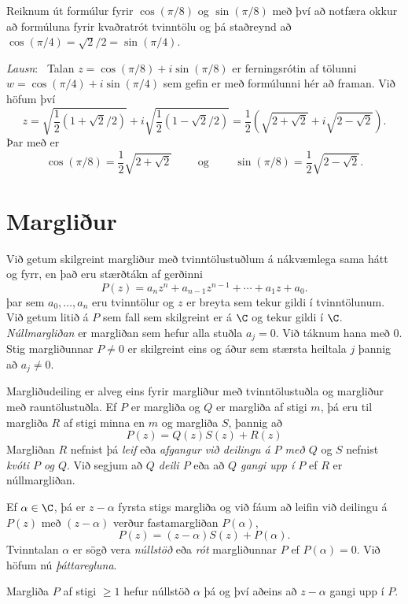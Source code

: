 \begin{sy} \label{sy:raetur} Reiknum út formúlur fyrir $\cos(\pi/8)$
og $\sin(\pi/8)$ með því að notfæra okkur að
formúluna fyrir kvaðratrót tvinntölu og þá staðreynd
að $\cos(\pi/4)=\sqrt 2/2=\sin(\pi/4)$.  

\smallskip\noindent
{\it Lausn}: \ Talan $z=\cos(\pi/8)+i\sin(\pi/8)$ er
ferningsrótin af tölunni $w=\cos(\pi/4)+i\sin(\pi/4)$
sem gefin er með formúlunni hér að framan.  Við höfum því
$$
z=\sqrt{\dfrac 12(1+\sqrt 2/2)}+i\sqrt{\dfrac 12(1-
\sqrt 2/2)}=\dfrac 12(\sqrt{2+\sqrt 2}+i\sqrt{2-\sqrt 2}).
$$
Þar með er 
$$
\cos(\pi/8)=\dfrac 12\sqrt{2+\sqrt 2}\qquad \text{ og } \qquad
\sin(\pi/8)=\dfrac 12\sqrt{2-\sqrt 2}.
$$
\end{sy}


\section{Margliður}

Við getum skilgreint margliður með tvinntölustuðlum á nákvæmlega sama
hátt og fyrr, en það eru stærðtákn af gerðinni
$$
P(z)=a_nz^n+a_{n-1}z^{n-1}+\cdots+a_1z+a_0.
$$
þar sem $a_0,\dots,a_n$ eru tvinntölur og $z$ er breyta sem tekur
gildi í tvinntölunum.  Við getum litið á $P$ sem fall sem skilgreint
er á $\C$ og tekur gildi í $\C$.  {\it Núllmargliðan} er margliðan sem
hefur alla stuðla $a_j=0$.  Við táknum hana með $0$.
Stig margliðunnar $P\neq 0$ er skilgreint eins og áður sem stærsta 
heiltala $j$ þannig að $a_j\neq 0$.  


Margliðudeiling er alveg eins fyrir margliður með tvinntölustuðla og
margliður með rauntölustuðla.  Ef $P$ er margliða  og 
$Q$ er margliða af stigi $m$, þá eru til margliða  $R$ af stigi minna en $m$
og margliða $S$, þannig að
$$
P(z)=Q(z)S(z)+R(z)
$$ 
Margliðan $R$ nefnist þá {\it leif} eða {\it afgangur við deilingu á
$P$ með $Q$} og $S$ nefnist {\it kvóti $P$ og $Q$}.  Við segjum að 
{\it $Q$ deili $P$} eða að {\it $Q$ gangi upp í $P$} ef $R$ er
núllmargliðan.  

Ef $\alpha\in \C$, þá er $z-\alpha$ fyrsta stigs margliða og við fáum
að leifin við deilingu á $P(z)$ með $(z-\alpha)$ verður fastamargliðan
$P(\alpha)$,
$$
P(z)=(z-\alpha)S(z)+P(\alpha).
$$
Tvinntalan $\alpha$ er sögð vera {\it núllstöð} eða {\it rót}
margliðunnar $P$ ef $P(\alpha)=0$.   Við höfum nú {\it  þáttaregluna}.

\begin{se}  Margliða $P$ af stigi $\geq 1$ hefur núllstöð $\alpha$
þá og því aðeins að $z-\alpha$ gangi upp í $P$.
\end{se}


